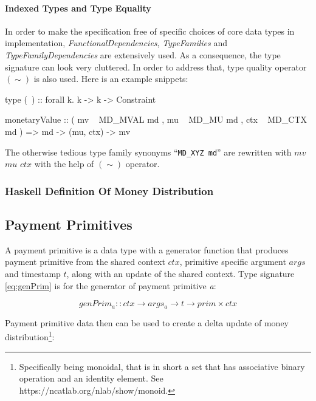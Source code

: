 \paragraph{Indexed Types and Type Equality}

In order to make the specification free of specific choices of core data types in
implementation, \textit{FunctionalDependencies}, \textit{TypeFamilies}
and \textit{TypeFamilyDependencies} are extensively used. As a consequence, the type signature can
look very cluttered. In order to address that, type quality operator $(\sim)$ is also used. Here is
an example snippets:

\begin{code}
    type (~) :: forall k. k -> k -> Constraint

    monetaryValue :: ( mv  ~ MD_MVAL md
                     , mu  ~ MD_MU md
                     , ctx ~ MD_CTX md
                     )
                  => md -> (mu, ctx) -> mv
\end{code}

The otherwise tedious type family synonyms ``\texttt{MD_XYZ md}'' are rewritten with $mv$
$mu$ $ctx$ with the help of $(\sim)$ operator.

\subsubsection{Haskell Definition Of Money Distribution}



\subsection{Payment Primitives}

A payment primitive is a data type with a generator function that produces payment primitive from
the shared context $ctx$, primitive specific argument $args$ and timestamp $t$, along with an update
of the shared context. Type signature \ref{eq:genPrim} is for the generator of payment
primitive \textit{a}:

\begin{equation}\label{eq:genPrim}
    genPrim_a :: ctx \rightarrow args_a \rightarrow t \rightarrow prim \times ctx
\end{equation}

Payment primitive data then can be used to create a delta update of money
distribution\footnote{Specifically being monoidal, that is in short a set that has associative
binary operation and an identity element. See https://ncatlab.org/nlab/show/monoid.}:

